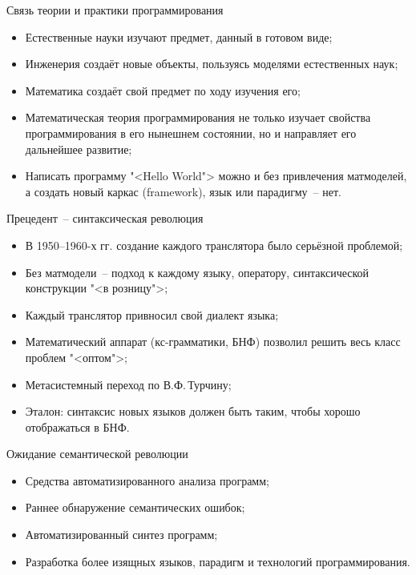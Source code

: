 \documentclass[landscape]{slides}
\begin{document}
\begin{slide}
Связь теории и практики программирования
\begin{itemize}
\item Естественные науки изучают предмет, данный в готовом виде;
\item Инженерия создаёт новые объекты, пользуясь моделями естественных наук;
\item Математика создаёт свой предмет по ходу изучения его;
\item Математическая теория программирования не только изучает свойства
        программирования в его нынешнем состоянии, но и направляет его
        дальнейшее развитие;
\item Написать программу "<Hello World"> можно и без привлечения
        матмоделей, а создать новый каркас (framework), язык или
        парадигму~-- нет.
\end{itemize}
\end{slide}

\begin{slide}
Прецедент~-- синтаксическая революция
\begin{itemize}
\item В 1950--1960-х гг. создание каждого транслятора было серьёзной проблемой;
\item Без матмодели~-- подход к каждому языку, оператору, синтаксической конструкции "<в розницу">;
\item Каждый транслятор привносил свой диалект языка;
\item Математический аппарат (кс-грамматики, БНФ) позволил
        решить весь класс проблем "<оптом">;
\item Метасистемный переход по В.Ф.\,Турчину;
\item Эталон: синтаксис новых языков должен быть таким, чтобы хорошо отображаться в БНФ.
\end{itemize}
\end{slide}

\begin{slide}
Ожидание семантической революции
\begin{itemize}
\item Средства автоматизированного анализа программ;
\item Раннее обнаружение семантических ошибок;
\item Автоматизированный синтез программ;
\item Разработка более изящных языков, парадигм и технологий программирования.
\end{itemize}
\end{slide}
\end{document}
